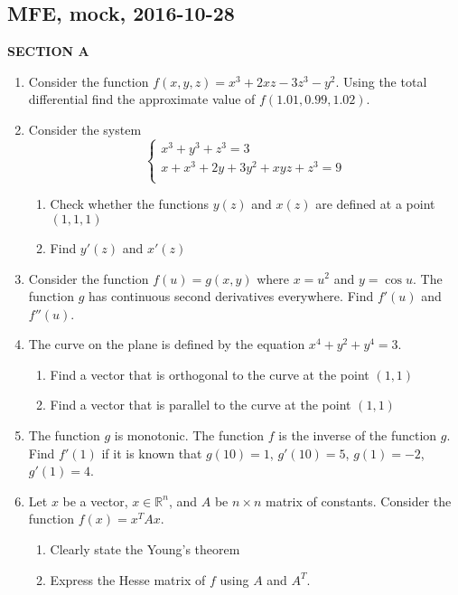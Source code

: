 \subsection{MFE, mock, 2016-10-28}

\textbf{SECTION A}

\begin{enumerate}

\item Consider the function $f(x,y,z)=x^3+2xz-3z^3-y^2$. Using the total differential find the approximate value of $f(1.01,0.99,1.02)$.

\item Consider the system
\[
\begin{cases}
x^3 + y^3 + z^3 = 3 \\
x + x^3 + 2y + 3y^2 + xyz + z^3 = 9 \\
\end{cases}
\]
\begin{enumerate}
  \item Check whether the functions $y(z)$ and $x(z)$ are defined at a point $(1, 1, 1)$
  \item Find $y'(z)$ and $x'(z)$
\end{enumerate}

\item Consider the function $f(u)=g(x,y)$ where $x=u^2$ and $y=\cos u$. The function $g$ has continuous second derivatives everywhere. Find $f'(u)$ and $f''(u)$.

\item The curve on the plane is defined by the equation $x^4 + y^2 + y^4 = 3$.
\begin{enumerate}
  \item Find a vector that is orthogonal to the curve at the point $(1, 1)$
  \item Find a vector that is parallel to the curve at the point $(1, 1)$
\end{enumerate}

\item The function $g$ is monotonic. The function $f$ is the inverse of the function $g$. Find $f'(1)$ if it is known that $g(10)=1$, $g'(10)=5$, $g(1)=-2$, $g'(1)=4$.

\item Let $x$ be a vector, $x\in \mathbb{R}^n$, and $A$ be $n\times n$ matrix of constants. Consider the function $f(x) = x^T A x$.
\begin{enumerate}
 \item Clearly state the Young's theorem
 \item Express the Hesse matrix of $f$ using $A$ and $A^T$.
\end{enumerate}





\end{enumerate}


